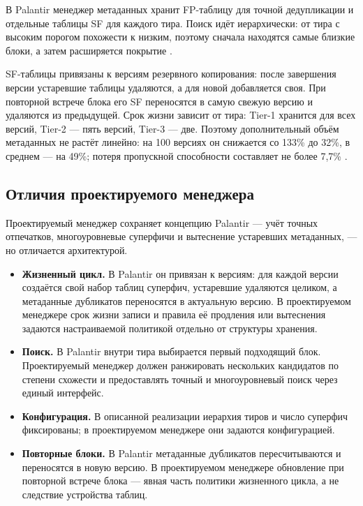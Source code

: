 \documentclass[a4paper]{article}
\begin{document}
В Palantir менеджер метаданных хранит FP-таблицу для точной дедупликации и
отдельные таблицы SF для каждого тира. Поиск идёт иерархически: от тира с
высоким порогом похожести к низким, поэтому сначала находятся самые близкие
блоки, а затем расширяется покрытие \cite{palantir}.

SF-таблицы привязаны к версиям резервного копирования: после завершения версии
устаревшие таблицы удаляются, а для новой добавляется своя. При повторной
встрече блока его SF переносятся в самую свежую версию и удаляются из
предыдущей. Срок жизни зависит от тира: Tier-1 хранится для всех версий,
Tier-2 --- пять версий, Tier-3 --- две. Поэтому дополнительный объём метаданных
не растёт линейно: на 100 версиях он снижается со 133\% до 32\%, в среднем ---
на 49\%; потеря пропускной способности составляет не более 7,7\%
\cite{palantir}.

\subsection{Отличия проектируемого менеджера}

Проектируемый менеджер сохраняет концепцию Palantir --- учёт точных отпечатков,
многоуровневые суперфичи и вытеснение устаревших метаданных, --- но отличается
архитектурой.

\begin{itemize}
    \item \textbf{Жизненный цикл.} В Palantir он привязан к версиям: для каждой
          версии создаётся свой набор таблиц суперфич, устаревшие удаляются
          целиком, а метаданные дубликатов переносятся в актуальную версию.
          В проектируемом менеджере срок жизни записи и правила её продления
          или вытеснения задаются настраиваемой политикой отдельно от структуры
          хранения.
    \item \textbf{Поиск.} В Palantir внутри тира выбирается первый подходящий
          блок. Проектируемый менеджер должен ранжировать нескольких кандидатов
          по степени схожести и предоставлять точный и многоуровневый поиск
          через единый интерфейс.
    \item \textbf{Конфигурация.} В описанной реализации иерархия тиров и число
          суперфич фиксированы; в проектируемом менеджере они задаются
          конфигурацией.
    \item \textbf{Повторные блоки.} В Palantir метаданные дубликатов
          пересчитываются и переносятся в новую версию. В проектируемом
          менеджере обновление при повторной встрече блока --- явная часть
          политики жизненного цикла, а не следствие устройства таблиц.
\end{itemize}
\end{document}
